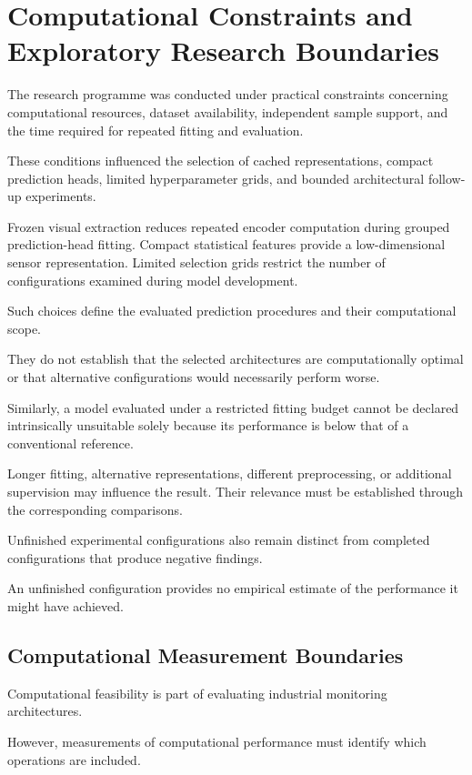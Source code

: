 \section{Computational Constraints and Exploratory Research Boundaries}
\label{sec:ch4-boundaries}

The research programme was conducted under practical constraints concerning computational resources, dataset availability, independent sample support, and the time required for repeated fitting and evaluation.

These conditions influenced the selection of cached representations, compact prediction heads, limited hyperparameter grids, and bounded architectural follow-up experiments.

Frozen visual extraction reduces repeated encoder computation during grouped prediction-head fitting. Compact statistical features provide a low-dimensional sensor representation. Limited selection grids restrict the number of configurations examined during model development.

Such choices define the evaluated prediction procedures and their computational scope.

They do not establish that the selected architectures are computationally optimal or that alternative configurations would necessarily perform worse.

Similarly, a model evaluated under a restricted fitting budget cannot be declared intrinsically unsuitable solely because its performance is below that of a conventional reference.

Longer fitting, alternative representations, different preprocessing, or additional supervision may influence the result. Their relevance must be established through the corresponding comparisons.

Unfinished experimental configurations also remain distinct from completed configurations that produce negative findings.

An unfinished configuration provides no empirical estimate of the performance it might have achieved.

\subsection{Computational Measurement Boundaries}

Computational feasibility is part of evaluating industrial monitoring architectures.

However, measurements of computational performance must identify which operations are included.

